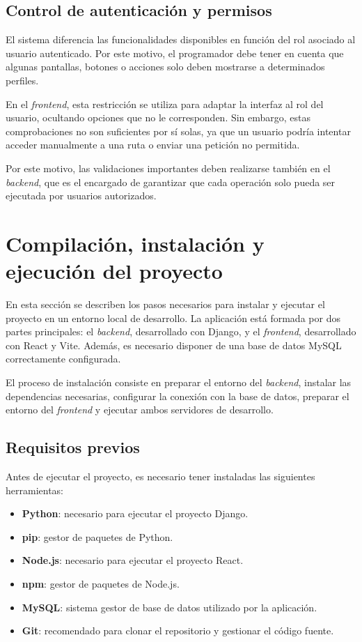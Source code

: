 \subsection{Control de autenticación y permisos}

El sistema diferencia las funcionalidades disponibles en función del rol asociado al usuario autenticado. Por este motivo, el programador debe tener en cuenta que algunas pantallas, botones o acciones solo deben mostrarse a determinados perfiles.

En el \textit{frontend}, esta restricción se utiliza para adaptar la interfaz al rol del usuario, ocultando opciones que no le corresponden. Sin embargo, estas comprobaciones no son suficientes por sí solas, ya que un usuario podría intentar acceder manualmente a una ruta o enviar una petición no permitida.

Por este motivo, las validaciones importantes deben realizarse también en el \textit{backend}, que es el encargado de garantizar que cada operación solo pueda ser ejecutada por usuarios autorizados.

\section{Compilación, instalación y ejecución del proyecto}

En esta sección se describen los pasos necesarios para instalar y ejecutar el proyecto en un entorno local de desarrollo. La aplicación está formada por dos partes principales: el \textit{backend}, desarrollado con Django, y el \textit{frontend}, desarrollado con React y Vite. Además, es necesario disponer de una base de datos MySQL correctamente configurada.

El proceso de instalación consiste en preparar el entorno del \textit{backend}, instalar las dependencias necesarias, configurar la conexión con la base de datos, preparar el entorno del \textit{frontend} y ejecutar ambos servidores de desarrollo.

\subsection{Requisitos previos}

Antes de ejecutar el proyecto, es necesario tener instaladas las siguientes herramientas:

\begin{itemize}
	\item \textbf{Python}: necesario para ejecutar el proyecto Django.
	\item \textbf{pip}: gestor de paquetes de Python.
	\item \textbf{Node.js}: necesario para ejecutar el proyecto React.
	\item \textbf{npm}: gestor de paquetes de Node.js.
	\item \textbf{MySQL}: sistema gestor de base de datos utilizado por la aplicación.
	\item \textbf{Git}: recomendado para clonar el repositorio y gestionar el código fuente.
\end{itemize}

